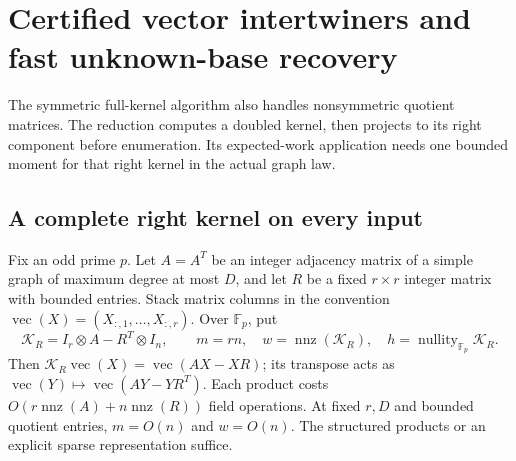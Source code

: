 \documentclass[11pt]{article}
\theoremstyle{definition}
\theoremstyle{remark}
\newcommand{\1}{\mathbf 1}
\providecommand{\Fp}{\mathbb F_p}
\providecommand{\nullity}{\operatorname{nullity}}
\begin{document}

\clearpage
\section{Certified vector intertwiners and fast unknown-base recovery}
\label{rec:sec:vector-algorithm}
The symmetric full-kernel algorithm also handles nonsymmetric quotient
matrices. The reduction computes a doubled kernel, then projects to its
right component before enumeration. Its expected-work application needs
one bounded moment for that right kernel in the actual graph law.

\subsection{A complete right kernel on every input}
Fix an odd prime $p$. Let $A=A^T$ be an integer adjacency matrix of a
simple graph of maximum degree at most $D$, and let $R$ be a fixed
$r\times r$ integer matrix with bounded entries. Stack matrix columns
in the convention $\operatorname{vec}(X)=(X_{:,1},\ldots,X_{:,r})$.
Over $\Fp$, put
\begin{equation}\label{rec:eq:vector-operator}
 \mathcal K_R=I_r\otimes A-R^T\otimes I_n,\qquad
 m=rn,\quad w=\operatorname{nnz}(\mathcal K_R),\quad
 h=\nullity_{\Fp}\mathcal K_R.
\end{equation}
Then $\mathcal K_R\operatorname{vec}(X)=\operatorname{vec}(AX-XR)$;
its transpose acts as $\operatorname{vec}(Y)\mapsto
\operatorname{vec}(AY-YR^T)$. Each product costs
$O(r\operatorname{nnz}(A)+n\operatorname{nnz}(R))$ field operations.
At fixed $r,D$ and bounded quotient entries, $m=O(n)$ and $w=O(n)$.
The structured products or an explicit sparse representation suffice.
\end{document}
